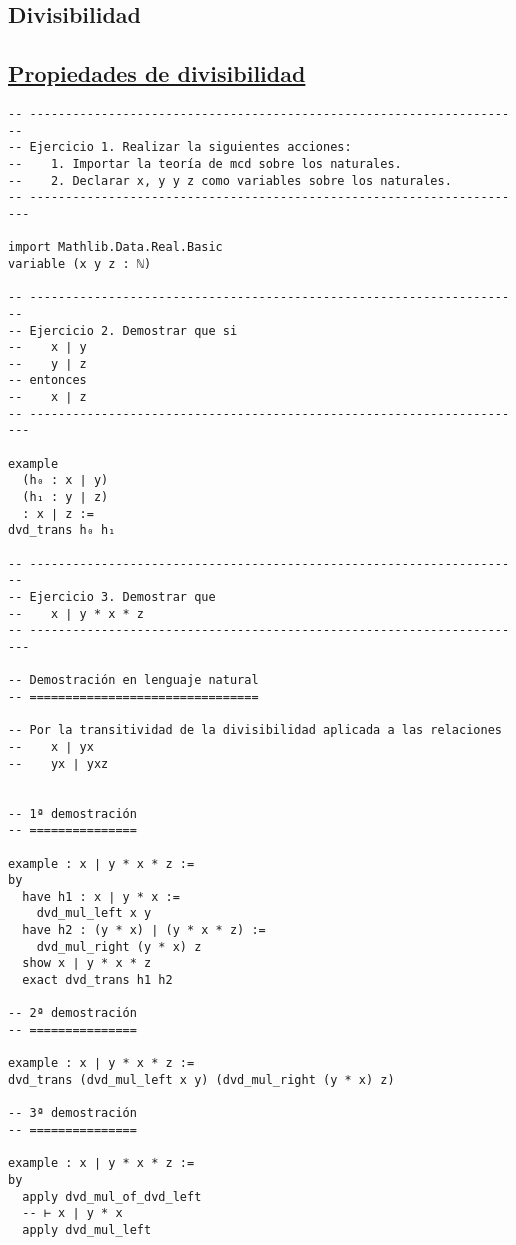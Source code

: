\subsection{Divisibilidad}
\label{sec:org043fd60}

\subsection{\href{./src/Basicos/Propiedades\_de\_divisibilidad.lean}{Propiedades de divisibilidad}}
\label{sec:orgd4d2f2e}
\begin{verbatim}
-- ---------------------------------------------------------------------
-- Ejercicio 1. Realizar la siguientes acciones:
--    1. Importar la teoría de mcd sobre los naturales.
--    2. Declarar x, y y z como variables sobre los naturales.
-- ----------------------------------------------------------------------

import Mathlib.Data.Real.Basic
variable (x y z : ℕ)

-- ---------------------------------------------------------------------
-- Ejercicio 2. Demostrar que si
--    x ∣ y
--    y ∣ z
-- entonces
--    x ∣ z
-- ----------------------------------------------------------------------

example
  (h₀ : x ∣ y)
  (h₁ : y ∣ z)
  : x ∣ z :=
dvd_trans h₀ h₁

-- ---------------------------------------------------------------------
-- Ejercicio 3. Demostrar que
--    x ∣ y * x * z
-- ----------------------------------------------------------------------

-- Demostración en lenguaje natural
-- ================================

-- Por la transitividad de la divisibilidad aplicada a las relaciones
--    x ∣ yx
--    yx ∣ yxz


-- 1ª demostración
-- ===============

example : x ∣ y * x * z :=
by
  have h1 : x ∣ y * x :=
    dvd_mul_left x y
  have h2 : (y * x) ∣ (y * x * z) :=
    dvd_mul_right (y * x) z
  show x ∣ y * x * z
  exact dvd_trans h1 h2

-- 2ª demostración
-- ===============

example : x ∣ y * x * z :=
dvd_trans (dvd_mul_left x y) (dvd_mul_right (y * x) z)

-- 3ª demostración
-- ===============

example : x ∣ y * x * z :=
by
  apply dvd_mul_of_dvd_left
  -- ⊢ x ∣ y * x
  apply dvd_mul_left


\end{verbatim}
